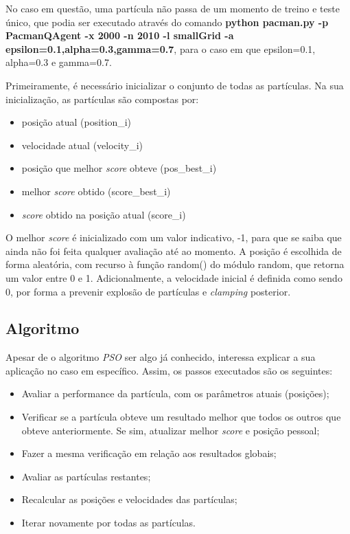 \documentclass[runningheads]{article}
\begin{document}
\par No caso em questão, uma partícula não passa de um momento de treino e teste único, que podia ser executado através do comando
\linebreak 
\textbf{python pacman.py -p PacmanQAgent -x 2000 -n 2010 -l smallGrid \linebreak -a epsilon=0.1,alpha=0.3,gamma=0.7}, para o caso em que epsilon=0.1, alpha=0.3 e gamma=0.7.
 

\par Primeiramente, é necessário inicializar o conjunto de todas as partículas. Na sua inicialização, as partículas são compostas por:
\begin{itemize}
    \item posição atual (position\_i)
    \item velocidade atual (velocity\_i)
    \item posição que melhor \textit{score} obteve (pos\_best\_i)
    \item melhor \textit{score} obtido (score\_best\_i)
    \item \textit{score} obtido na posição atual (score\_i)
\end{itemize}
\par O melhor \textit{score} é inicializado com um valor indicativo, -1, para que se saiba que ainda não foi feita qualquer avaliação até ao momento. A posição é escolhida de forma aleatória, com recurso à função random() do módulo random, que retorna um valor entre 0 e 1. Adicionalmente, a velocidade inicial é definida como sendo 0, por forma a prevenir explosão de partículas e \textit{clamping} posterior.

\subsection{Algoritmo}
\par Apesar de o algoritmo \textit{PSO} ser algo já conhecido, interessa explicar a sua aplicação no caso em específico. Assim, os passos executados são os seguintes:
\begin{itemize}
    \item Avaliar a performance da partícula, com os parâmetros atuais (posições);
    \item Verificar se a partícula obteve um resultado melhor que todos os outros que obteve anteriormente. Se sim, atualizar melhor \textit{score} e posição pessoal;
    \item Fazer a mesma verificação em relação aos resultados globais;
    \item Avaliar as partículas restantes;
    \item Recalcular as posições e velocidades das partículas;
    \item Iterar novamente por todas as partículas.
\end{itemize}
\end{document}
